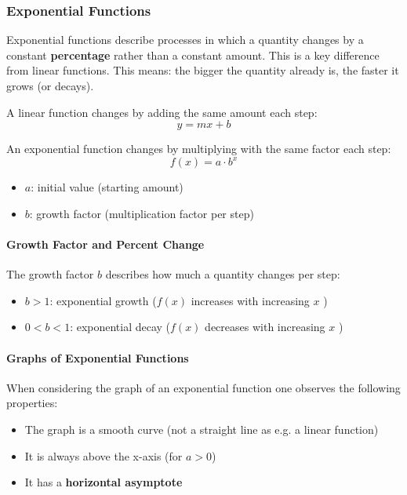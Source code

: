 \subsubsection{Exponential Functions}

Exponential functions describe processes in which a quantity changes by a constant \textbf{percentage} rather than a constant amount. This is a key difference from linear functions. This means: the bigger the quantity already is, the faster it grows (or decays).

A linear function changes by adding the same amount each step:
\begin{equation}
    y = mx + b
\end{equation}

An exponential function changes by multiplying with the same factor each step:
\begin{equation}
    f(x) = a \cdot b^x
\end{equation}

\begin{itemize}
    \item $a$: initial value (starting amount)
    \item $b$: growth factor (multiplication factor per step)
\end{itemize}

\paragraph{Growth Factor and Percent Change}

The growth factor $b$ describes how much a quantity changes per step:
\begin{itemize}
    \item $b > 1$: exponential growth ($f(x)$ increases with increasing $x$ )
    \item $0 < b < 1$: exponential decay ($f(x)$ decreases with increasing $x$ )
\end{itemize}

\paragraph{Graphs of Exponential Functions}
When considering the graph of an exponential function one observes the following properties:

\begin{itemize}
    \item The graph is a smooth curve (not a straight line as e.g. a linear function)
    \item It is always above the x-axis (for $a > 0$)
    \item It has a \textbf{horizontal asymptote}
\end{itemize}

